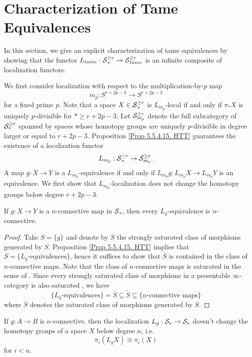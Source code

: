 \section{Characterization of Tame Equivalences}
In this section, we give an explicit characterization of tame equivalences by showing that the functor $L_{tame}:\operatorname{\mathcal{S}}^{\geq r}_* \to \operatorname{\mathcal{S}}^{\geq r}_{tame}$ is an infinite composite of localization functors.

We first consider localization with respect to the multiplication-by-$p$ map $$
m_p:S^{r+2p-3}\to S^{r+2p-3}$$ for a fixed prime $p$. 
Note that a space $X\in \operatorname{\mathcal{S}}^{\geq r}_*$ is $L_{m_p}$-local if and only if $\pi_{*}X$ is uniquely $p$-divisible for $* \geq r+2p-3$.
Let ${\mathcal{S}}^{\geq r}_{m_p}$ denote the full subcategory of ${\mathcal{S}}^{\geq r}_*$ spanned by spaces whose homotopy groups are uniquely $p$-divisible in degree larger or equal to $r+2p-3$.
Proposition \ref{Prop 5.5.4.15. HTT} guarantees the existence of a localization functor
\[
L_{m_p}:\operatorname{\mathcal{S}}^{\geq r}_{*} \to {\mathcal{S}}^{\geq r}_{m_p}.
\]
A map $g:X\to Y$ is a $L_{m_p}$-equivalence if and only if 
$L_{m_p}g: L_{m_p}X \to L_{m_p}Y$ is an equivalence.
We first show that $L_{m_p}$-localization does not change the homotopy groups below degree $r+2p-3$. 
\begin{proposition}
\label{connectivity of local equivalences of spaces}
	If $g: X\to Y$ is a $n$-connective map in $\operatorname{\mathcal{S}}_*$, then every $L_g$-equivalence is $n$-connective.
\end{proposition}
\begin{proof}
	Take $S=\{g\}$ and denote by $\overline{S}$ the strongly saturated class of morphisms generated by $S$. Proposition \ref{Prop 5.5.4.15. HTT} implies that  $\overline{S}= \{L_g\text{-equivalences}\}$, hence it suffices to show that $\overline{S}$ is contained in the class of $n$-connective maps. Note that the class of $n$-connective maps is saturated in the sense of \cite[Definition 5.5.5.1]{HTT}. Since every strongly saturated class of morphisms in a presentable $\infty$-category is also saturated \cite[Example 5.5.5.5.]{HTT}, we have 
	$$
	\{L_g\text{-equivalences}\}=\overline{S} \subseteq \tilde{S} \subseteq \{n\text{-connective maps}\}
	$$
	where $\tilde{S}$ denotes the saturated class of morphisms generated by $S$.
\end{proof}

\begin{corollary}
\label{L_g doesn't change lower hpty groups if g is n-conn}
        If $g:A\to B$ is $n$-connective, then  the localization $L_g:{\mathcal{S}}_*\to {\mathcal{S}}_*$ doesn't change the homotopy groups of a space $X$ below degree $n$, i.e. 
	\[
	\pi_{i}(L_gX) \cong \pi_i(X)
	\]
	for $i< n$.
\end{corollary}

